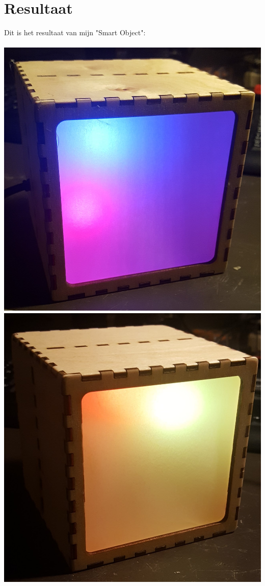 \documentclass[a4paper,12pt]{article}
\begin{document}
\section{Resultaat}
Dit is het resultaat van mijn "Smart Object": 
\\ \\
\includegraphics[scale=0.15]{resultaat1}
\includegraphics[scale=0.171]{resultaat2}
\end{document}
